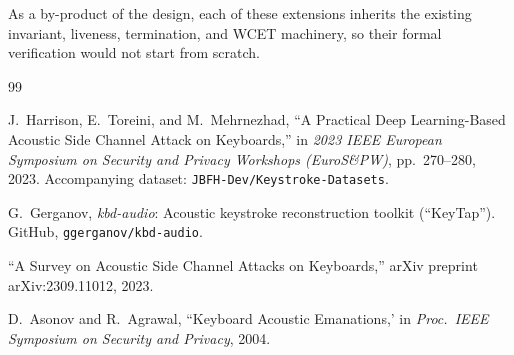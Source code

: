 \documentclass[11pt,a4paper]{article}
\begin{document}
As a by-product of the design, each of these extensions inherits the existing
invariant, liveness, termination, and WCET machinery, so their formal
verification would not start from scratch.

\begin{thebibliography}{99}

 J.~Harrison, E.~Toreini, and M.~Mehrnezhad,
  ``A Practical Deep Learning-Based Acoustic Side Channel Attack on
  Keyboards,'' in \emph{2023 IEEE European Symposium on Security and Privacy
  Workshops (EuroS\&PW)}, pp.~270--280, 2023. Accompanying dataset:
  \texttt{JBFH-Dev/Keystroke-Datasets}.

 G.~Gerganov, \emph{kbd-audio}: Acoustic keystroke
  reconstruction toolkit (``KeyTap''). GitHub,
  \texttt{ggerganov/kbd-audio}.

 ``A Survey on Acoustic Side Channel Attacks on Keyboards,''
  arXiv preprint arXiv:2309.11012, 2023.

 D.~Asonov and R.~Agrawal, ``Keyboard Acoustic Emanations,'
  in \emph{Proc.\ IEEE Symposium on Security and Privacy}, 2004.

\end{thebibliography}
\end{document}
